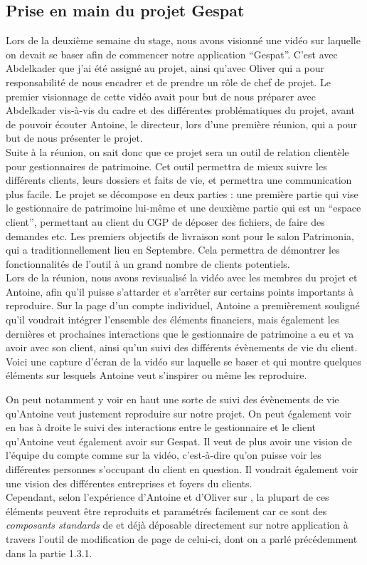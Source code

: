 \documentclass[12pt,oneside,noprintercorrection]{iut}
\begin{document}
\subsection{Prise en main du projet Gespat}
Lors de la deuxième semaine du stage, nous avons visionné une vidéo sur laquelle on devait se baser afin de commencer notre application ``Gespat''. C'est avec Abdelkader que j'ai été assigné au projet, ainsi qu'avec Oliver qui a pour responsabilité de nous encadrer et de prendre un rôle de chef de projet. Le premier visionnage de cette vidéo avait pour but de nous préparer avec Abdelkader vis-à-vis du cadre et des différentes problématiques du projet, avant de pouvoir écouter Antoine, le directeur, lors d'une première réunion, qui a pour but de nous présenter le projet. 
~\\\indent Suite à la réunion, on sait donc que ce projet sera un outil de relation clientèle pour gestionnaires de patrimoine. Cet outil permettra de mieux suivre les différents clients, leurs dossiers et faits de vie, et permettra une communication plus facile. Le projet se décompose en deux parties : une première partie qui vise le gestionnaire de patrimoine lui-même et une deuxième partie qui est un “espace client”, permettant au client du CGP de déposer des fichiers, de faire des demandes etc. Les premiers objectifs de livraison sont pour le salon Patrimonia, qui a traditionnellement lieu en Septembre. Cela permettra de démontrer les fonctionnalités de l’outil à un grand nombre de clients potentiels. 
~\\\indent Lors de la réunion, nous avons revisualisé la vidéo avec les membres du projet et Antoine, afin qu'il puisse s'attarder et s'arrêter sur certains points importants à reproduire. Sur la page d'un compte individuel, Antoine a premièrement souligné qu'il voudrait intégrer l'ensemble des éléments financiers, mais également les dernières et prochaines interactions que le gestionnaire de patrimoine a eu et va avoir avec son client, ainsi qu'un suivi des différents évènements de vie du client. Voici une capture d'écran de la vidéo sur laquelle se baser et qui montre quelques éléments sur lesquels Antoine veut s'inspirer ou même les reproduire.


On peut notamment y voir en haut une sorte de suivi des évènements de vie qu'Antoine veut justement reproduire sur notre projet. On peut également voir en bas à droite le suivi des interactions entre le gestionnaire et le client qu'Antoine veut également avoir sur Gespat. Il veut de plus avoir une vision de l'équipe du compte comme sur la vidéo, c'est-à-dire qu'on puisse voir les différentes personnes s'occupant du client en question. Il voudrait également voir une vision des différentes entreprises et foyers du clients.
~\\\indent Cependant, selon l'expérience d'Antoine et d'Oliver sur \slf{}, la plupart de ces éléments peuvent être reproduits et paramétrés facilement car ce sont des \textit{composants standards} de \slf{} et déjà déposable directement sur notre application à travers l'outil de modification de page de celui-ci, dont on a parlé précédemment dans la partie 1.3.1.
\end{document}
